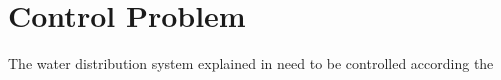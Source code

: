 \section{Control Problem}
\label{control_problem}

The water distribution system explained in  need to be controlled according the 